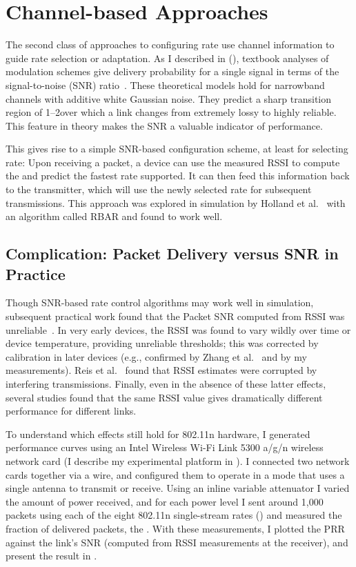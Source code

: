 \section{Channel-based Approaches}
The second class of approaches to configuring rate use channel information to guide rate selection or adaptation.
As I described in  (), textbook analyses of modulation schemes give delivery probability for a single signal in terms of the signal-to-noise (SNR) ratio~\cite{Goldsmith}.
These theoretical models hold for narrowband channels with additive white Gaussian noise. They predict a sharp transition region of 1--2\dB over which a link changes from extremely lossy to highly reliable. This feature in theory makes the SNR a valuable indicator of performance.

This gives rise to a simple SNR-based configuration scheme, at least for selecting rate: Upon receiving a packet, a device can use the measured RSSI to compute the  and predict the fastest rate supported. It can then feed this information back to the transmitter, which will use the newly selected rate for subsequent transmissions. This approach was explored in simulation by Holland et al.~\cite{Holland_RBAR} with an algorithm called RBAR and found to work well.

\subsection{Complication: Packet Delivery versus SNR in Practice}
Though SNR-based rate control algorithms may work well in simulation, subsequent practical work found that the Packet SNR computed from RSSI was unreliable~\cite{Aguayo_Roofnet, Reis_interference, Zhao_sensys03}. In very early devices, the RSSI was found to vary wildly over time or device temperature, providing unreliable thresholds; this was corrected by calibration in later devices (e.g., confirmed by Zhang et al.~\cite{Zhang_SNRguided} and by my measurements). Reis et al.~\cite{Reis_interference} found that RSSI estimates were corrupted by interfering transmissions. Finally, even in the absence of these latter effects, several studies found that the same RSSI value gives dramatically different performance for different links.

To understand which effects still hold for 802.11n hardware, I generated performance curves using an Intel Wireless Wi-Fi Link 5300 a/g/n wireless network card (I describe my experimental platform in ). I connected two network cards together via a wire, and configured them to operate in a mode that uses a single antenna to transmit or receive. Using an inline variable attenuator I varied the amount of power received, and for each power level I sent around 1,000 packets using each of the eight 802.11n single-stream rates () and measured the fraction of delivered packets, the . With these measurements, I plotted the PRR against the link's SNR (computed from RSSI measurements at the receiver), and present the result in . 

